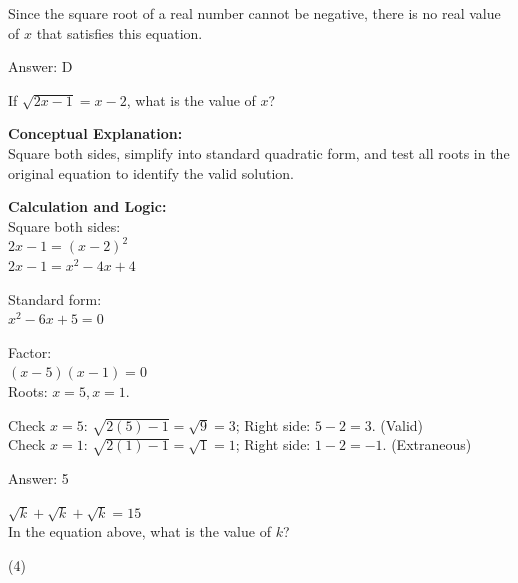 \documentclass[11pt,paper=a4,answers]{exam}
\begin{document}
\begin{questions}
\begin{solution}
Since the square root of a real number cannot be negative, there is no real value of $x$ that satisfies this equation.

\vspace{25pt}

Answer: \colorbox{yellow!100}{D}
\end{solution}

\vspace{40pt}

\question
If $\sqrt{2x - 1} = x - 2$, what is the value of $x$?

\begin{solution}
\textbf{Conceptual Explanation:} \\
Square both sides, simplify into standard quadratic form, and test all roots in the original equation to identify the valid solution.

\vspace{20pt}

\textbf{Calculation and Logic:} \\
Square both sides: \\
$2x - 1 = (x - 2)^2$ \\
$2x - 1 = x^2 - 4x + 4$

\vspace{10pt}

Standard form: \\
$x^2 - 6x + 5 = 0$

\vspace{10pt}

Factor: \\
$(x - 5)(x - 1) = 0$ \\
Roots: $x = 5, x = 1$.

\vspace{10pt}

Check $x = 5$: $\sqrt{2(5)-1} = \sqrt{9} = 3$; Right side: $5-2 = 3$. (Valid) \\
Check $x = 1$: $\sqrt{2(1)-1} = \sqrt{1} = 1$; Right side: $1-2 = -1$. (Extraneous)

\vspace{25pt}

Answer: \colorbox{yellow!100}{5}
\end{solution}

\vspace{40pt}

\question
$\sqrt{k} + \sqrt{k} + \sqrt{k} = 15$ \\
In the equation above, what is the value of $k$?
\begin{tasks}(4)
\end{tasks}


\end{questions}
\end{document}
